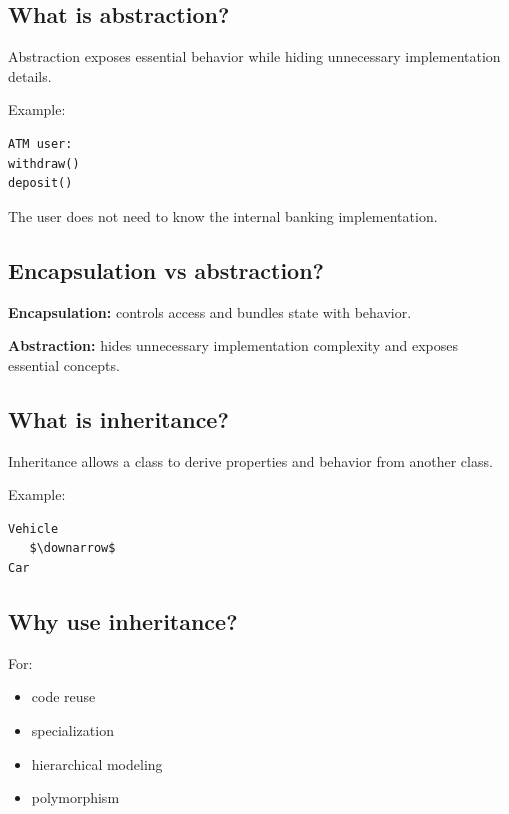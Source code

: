 \medskip

\subsection{What is abstraction?}

Abstraction exposes essential behavior while hiding unnecessary implementation details.

Example:

\begin{lstlisting}
ATM user:
withdraw()
deposit()
\end{lstlisting}

The user does not need to know the internal banking implementation.

\medskip

\subsection{Encapsulation vs abstraction?}

\textbf{Encapsulation:} controls access and bundles state with behavior.

\textbf{Abstraction:} hides unnecessary implementation complexity and exposes essential concepts.

\medskip

\subsection{What is inheritance?}

Inheritance allows a class to derive properties and behavior from another class.

Example:

\begin{lstlisting}
Vehicle
   $\downarrow$
Car
\end{lstlisting}

\medskip

\subsection{Why use inheritance?}

For:

\begin{itemize}
  \item code reuse
  \item specialization
  \item hierarchical modeling
  \item polymorphism
\end{itemize}

